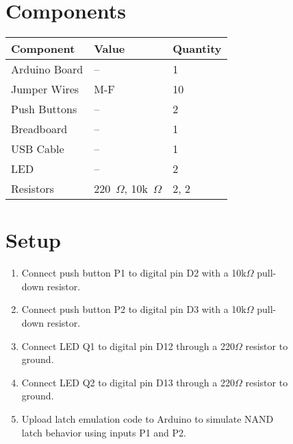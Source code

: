 \documentclass[12pt,a4paper]{article}
\begin{document}
\begin{figure}[H]
\begin{minipage}[t]{0.48\textwidth}
    \section*{Components}
    \small
    \renewcommand{\arraystretch}{1.3}
    \begin{tabular}{|l|l|l|}
      \hline
      \textbf{Component} & \textbf{Value} & \textbf{Quantity} \\ \hline
      Arduino Board & -- & 1 \\ \hline
      Jumper Wires & M-F & 10 \\ \hline
      Push Buttons & -- & 2 \\ \hline
      Breadboard & -- & 1 \\ \hline
      USB Cable & -- & 1 \\ \hline
      LED & -- & 2 \\ \hline
      Resistors & 220~$\Omega$, 10k~$\Omega$ & 2, 2 \\ \hline
    \end{tabular}

    \vspace{0.8cm}
    \section*{Setup}
    \small
    \begin{enumerate}[left=0pt]
      \item Connect push button P1 to digital pin D2 with a 10k$\Omega$ pull-down resistor.
      \item Connect push button P2 to digital pin D3 with a 10k$\Omega$ pull-down resistor.
      \item Connect LED Q1 to digital pin D12 through a 220$\Omega$ resistor to ground.
      \item Connect LED Q2 to digital pin D13 through a 220$\Omega$ resistor to ground.
      \item Upload latch emulation code to Arduino to simulate NAND latch behavior using inputs P1 and P2.
    \end{enumerate}
  \end{minipage}
\end{figure}


\newpage
\end{document}
